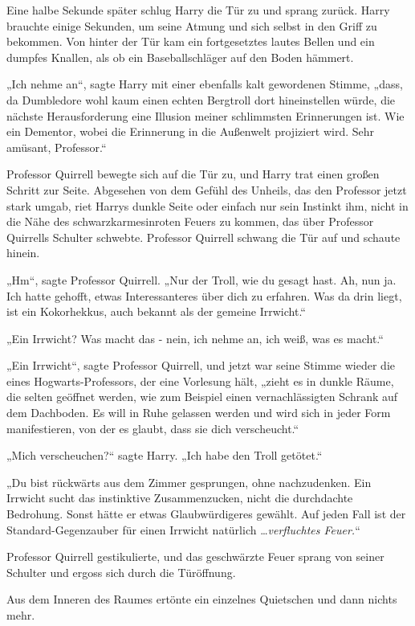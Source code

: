 {Eine halbe Sekunde später schlug Harry die Tür zu und sprang zurück. Harry brauchte einige Sekunden, um seine Atmung und sich selbst in den Griff zu bekommen. Von hinter der Tür kam ein fortgesetztes lautes Bellen und ein dumpfes Knallen, als ob ein Baseballschläger auf den Boden hämmert.

„Ich nehme an“, sagte Harry mit einer ebenfalls kalt gewordenen Stimme, „dass, da Dumbledore wohl kaum einen echten Bergtroll dort hineinstellen würde, die nächste Herausforderung eine Illusion meiner schlimmsten Erinnerungen ist. Wie ein Dementor, wobei die Erinnerung in die Außenwelt projiziert wird. Sehr amüsant, Professor.“

Professor Quirrell bewegte sich auf die Tür zu, und Harry trat einen großen Schritt zur Seite. Abgesehen von dem Gefühl des Unheils, das den Professor jetzt stark umgab, riet Harrys dunkle Seite oder einfach nur sein Instinkt ihm, nicht in die Nähe des schwarzkarmesinroten Feuers zu kommen, das über Professor Quirrells Schulter schwebte. Professor Quirrell schwang die Tür auf und schaute hinein.

„Hm“, sagte Professor Quirrell. „Nur der Troll, wie du gesagt hast. Ah, nun ja. Ich hatte gehofft, etwas Interessanteres über dich zu erfahren. Was da drin liegt, ist ein Kokorhekkus, auch bekannt als der gemeine Irrwicht.“

„Ein Irrwicht? Was macht das - nein, ich nehme an, ich weiß, was es macht.“

„Ein Irrwicht“, sagte Professor Quirrell, und jetzt war seine Stimme wieder die eines Hogwarts-Professors, der eine Vorlesung hält, „zieht es in dunkle Räume, die selten geöffnet werden, wie zum Beispiel einen vernachlässigten Schrank auf dem Dachboden. Es will in Ruhe gelassen werden und wird sich in jeder Form manifestieren, von der es glaubt, dass sie dich verscheucht.“

„Mich verscheuchen?“ sagte Harry. „Ich habe den Troll getötet.“

„Du bist rückwärts aus dem Zimmer gesprungen, ohne nachzudenken. Ein Irrwicht sucht das instinktive Zusammenzucken, nicht die durchdachte Bedrohung. Sonst hätte er etwas Glaubwürdigeres gewählt. Auf jeden Fall ist der Standard-Gegenzauber für einen Irrwicht natürlich …\emph{verfluchtes Feuer.}“

Professor Quirrell gestikulierte, und das geschwärzte Feuer sprang von seiner Schulter und ergoss sich durch die Türöffnung.

Aus dem Inneren des Raumes ertönte ein einzelnes Quietschen und dann nichts mehr.

}
